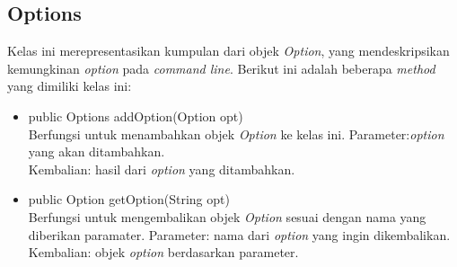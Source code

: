 \subsection{Options}
\label{subsec:options}
Kelas ini merepresentasikan kumpulan dari objek \textit{Option}, yang mendeskripsikan kemungkinan \textit{option} pada \textit{command line}. Berikut ini adalah beberapa \textit{method} yang dimiliki kelas ini: 
\begin{itemize}
\item public Options addOption(Option opt)\\
Berfungsi untuk menambahkan objek \textit{Option} ke kelas ini.
Parameter:\textit{option} yang akan ditambahkan.\\
Kembalian: hasil dari \textit{option} yang ditambahkan.

\item public Option getOption(String opt)\\
Berfungsi untuk mengembalikan objek \textit{Option} sesuai dengan nama yang diberikan paramater. 
Parameter: nama dari \textit{option} yang ingin dikembalikan.\\
Kembalian: objek \textit{option} berdasarkan parameter.

\end{itemize}


